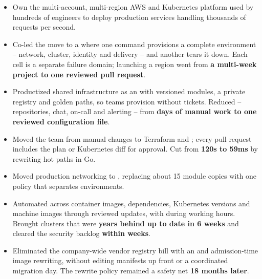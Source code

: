 \begin{itemize}
\item Own the multi-account, multi-region AWS and Kubernetes platform used by
hundreds of engineers to deploy production services handling thousands of
requests per second.
\item Co-led the move to a  where
one command provisions a complete environment -- network, cluster, identity
and delivery -- and another tears it down. Each cell is a separate failure domain; launching a region went
from \textbf{a multi-week project to one reviewed pull request}.
\item Productized shared infrastructure as an  with versioned modules,
a private registry and golden paths, so teams provision without tickets. Reduced
 -- repositories,
chat, on-call and alerting -- from \textbf{days of manual work to one reviewed
configuration file}.
\item Moved the team from manual changes to Terraform and
; every pull
request includes the plan or Kubernetes diff for approval.
Cut  from
\textbf{120s to 59ms} by rewriting hot paths in Go.
\item Moved production networking to , replacing about 15 module
copies with one policy that separates environments.
\item Automated  across
container images, dependencies, Kubernetes versions and machine images through
reviewed updates, with  during working hours. Brought clusters that were
\textbf{years behind up to date in 6 weeks} and cleared the security backlog
\textbf{within weeks}.
\item Eliminated the company-wide vendor registry bill with an
 and
admission-time image rewriting, without editing manifests up front or a coordinated
migration day. The rewrite policy remained a safety net \textbf{18 months later}.

\end{itemize}
